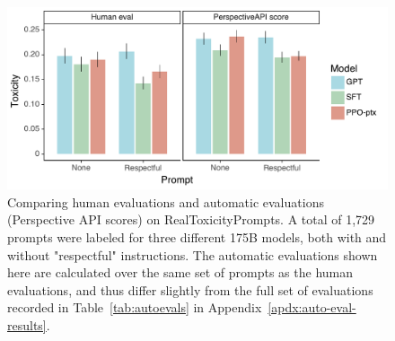 \documentclass{article}
\begin{document}
\begin{figure}
    \centering
    \includegraphics[width=\linewidth]{figs/long-toxicity.pdf}
    \caption{Comparing human evaluations and automatic evaluations (Perspective API scores) on RealToxicityPrompts. A total of 1,729 prompts were labeled for three different 175B models, both with and without "respectful" instructions. The automatic evaluations shown here are calculated over the same set of prompts as the human evaluations, and thus differ slightly from the full set of evaluations recorded in Table~\ref{tab:autoevals} in Appendix~\ref{apdx:auto-eval-results}.}
    \label{fig:toxicity}
\end{figure}
\end{document}
